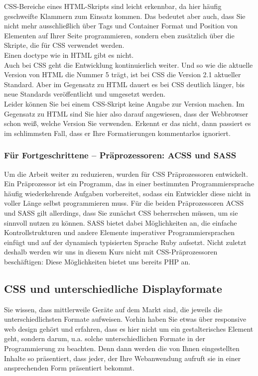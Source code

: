 CSS-Bereiche eines HTML-Skripts sind leicht erkennbar, da hier häufig geschweifte Klammern zum Einsatz kommen. Das bedeutet aber auch, dass Sie nicht mehr ausschließlich über Tags und Container Format und Position von Elementen auf Ihrer Seite programmieren, sondern eben zusätzlich über die Skripte, die für CSS verwendet werden.\\

Einen doctype wie in HTML gibt es nicht.\\

Auch bei CSS geht die Entwicklung kontinuierlich weiter. Und so wie die aktuelle Version von HTML die Nummer 5 trägt, ist bei CSS die Version 2.1 aktueller Standard. Aber im Gegensatz zu HTML dauert es bei CSS deutlich länger, bis neue Standards veröffentlicht und umgesetzt werden.\\

Leider können Sie bei einem CSS-Skript keine Angabe zur Version machen. Im Gegensatz zu HTML sind Sie hier also darauf angewiesen, dass der Webbrowser schon weiß, welche Version Sie verwenden. Erkennt er das nicht, dann passiert es im schlimmsten Fall, dass er Ihre Formatierungen kommentarlos ignoriert.

\subsubsection{Für Fortgeschrittene – Präprozessoren: ACSS und SASS}

Um die Arbeit weiter zu reduzieren, wurden für CSS Präprozessoren entwickelt. Ein Präprozessor ist ein Programm, das in einer bestimmten Programmiersprache häufig wiederkehrende Aufgaben vorbereitet, sodass ein Entwickler diese nicht in voller Länge selbst programmieren muss. Für die beiden Präprozessoren ACSS und SASS gilt allerdings, dass Sie zunächst CSS beherrschen müssen, um sie sinnvoll nutzen zu können. SASS bietet dabei Möglichkeiten an, die einfache Kontrollstrukturen und andere Elemente imperativer Programmiersprachen einfügt und auf der dynamisch typisierten Sprache Ruby aufsetzt. Nicht zuletzt deshalb werden wir uns in diesem Kurs nicht mit CSS-Präprozessoren beschäftigen: Diese Möglichkeiten bietet uns bereits PHP an.

\subsection{CSS und unterschiedliche Displayformate}

Sie wissen, dass mittlerweile Geräte auf dem Markt sind, die jeweils die unterschiedlichsten Formate aufweisen. Vorhin haben Sie etwas über responsive web design gehört und erfahren, dass es hier nicht um ein gestalterisches Element geht, sondern darum, u.a. solche unterschiedlichen Formate in der Programmierung zu beachten. Denn dann werden die von Ihnen eingestellten Inhalte so präsentiert, dass jeder, der Ihre Webanwendung aufruft sie in einer ansprechenden Form präsentiert bekommt.\\

